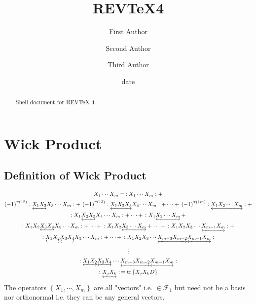 \documentclass[aps,preprint]{revtex4}%
\begin{document}
\title[Short title for running header]{REV\TeX4}
\author{First Author}
\author{Second Author}
\author{Third Author}

\begin{abstract}
Shell document for REV\TeX{} 4.

\end{abstract}
\date[Date text]{date}




\maketitle
\tableofcontents


\section{Wick Product}

\subsection{Definition of Wick Product}%

\begin{gather}
X_{1}\cdots X_{m}=\,:X_{1}\cdots X_{m}:+\\
\left(  -1\right)  ^{\pi\left(  12\right)  }:\underleftrightarrow{X_{1}X_{2}%
}X_{3}\cdots X_{m}:+\,\left(  -1\right)  ^{\pi\left(  13\right)
}:\underleftrightarrow{X_{1}X_{2}X_{3}}X_{4}\cdots X_{m}:+\cdots+\,\left(
-1\right)  ^{\pi\left(  1m\right)  }:\underleftrightarrow{X_{1}X_{2}\cdots
X_{m}}:+\\
:X_{1}\underleftrightarrow{X_{2}X_{3}}X_{4}\cdots X_{m}:+\cdots+\,:X_{1}%
\underleftrightarrow{X_{2}\cdots X_{m}}\,+\\
:X_{1}X_{2}\underleftrightarrow{X_{3}X_{4}}X_{5}\cdots X_{m}:+\cdots
+\,:X_{1}X_{2}\underleftrightarrow{X_{3}\cdots X_{m}}+\cdots+\,:X_{1}%
X_{2}X_{3}\cdots\underleftrightarrow{X_{m-1}X_{m}}:+\\
:\underleftrightarrow{X_{1}X_{2}}\underleftrightarrow{X_{3}X_{4}}X_{5}\cdots
X_{m}:+\cdots+\,:X_{1}X_{2}X_{3}\cdots\underleftrightarrow{X_{m-3}X_{m-2}%
}\underleftrightarrow{X_{m-1}X_{m}}:\\
\vdots\\
:\underleftrightarrow{X_{1}X_{2}}\underleftrightarrow{X_{3}X_{4}}%
\cdots\underleftrightarrow{X_{m-3}X_{m-2}}\underleftrightarrow{X_{m-1}X_{m}%
}:\\
:\underleftrightarrow{X_{j}X_{k}}:\,=\operatorname*{tr}\left\{  X_{j}%
X_{k}D\right\}
\end{gather}
The operators $\left\{  X_{1},\cdots,X_{m}\right\}  $ are all "vectors" i.e.
$\in\mathcal{F}_{1}$ but need not be a basis nor orthonormal i.e. they can be
any general vectors.
\end{document}
